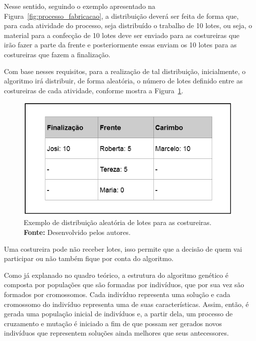 \par Nesse sentido, seguindo o exemplo apresentado  na Figura~\ref{fig:processo_fabricacao}, a distribuição deverá ser feita de forma que, para cada atividade do processo, seja distribuído o trabalho de 10 lotes, ou seja, o material para a confecção de 10 lotes deve ser enviado para as costureiras que irão fazer a parte da frente e posteriormente essas enviam os 10 lotes para as costureiras que fazem a finalização.

\par Com base nesses requisitos, para a realização de tal distribuição, inicialmente, o algoritmo irá distribuir, 
de forma aleatória, o número de lotes definido entre as costureiras de cada atividade,
conforme mostra a Figura~\ref{fig:distribuicao_lotes_costureiras}.

\begin{figure}[h!]
	\centerline{\includegraphics[scale=0.5]{./imagens/distribuicao_exemplo.png}}
	\caption[Exemplo de distribuição aleatória de lotes para as costureiras.]
	{Exemplo de distribuição aleatória de lotes para as costureiras.
	\textbf{Fonte:} Desenvolvido pelos autores.}
	\label{fig:distribuicao_lotes_costureiras}
\end{figure}

\par Uma costureira pode não receber lotes, isso permite que a decisão de
quem vai participar ou não também fique por conta do algoritmo.

\par Como já explanado no quadro teórico, a estrutura do algoritmo genético é composta
por populações que são formadas por indivíduos, que por sua vez são formados por cromossomos.
Cada indivíduo representa uma solução e cada cromossomo do indivíduo representa uma de suas características. 
Assim, então, é gerada uma população inicial de indivíduos e, a partir dela, um
processo de cruzamento e mutação é iniciado a fim de que possam ser gerados
novos indivíduos que representem soluções ainda melhores que seus antecessores.

